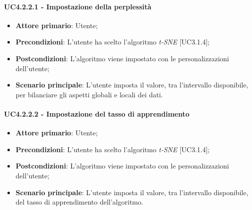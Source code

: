 \paragraph{UC4.2.2.1 - Impostazione della perplessità}
\begin{itemize}
	\item \textbf{Attore primario}: Utente;
	
	\item \textbf{Precondizioni}: L'utente ha scelto l'algoritmo \textit{t-SNE} [UC3.1.4];
	
	\item \textbf{Postcondizioni}: L'algoritmo viene impostato con le personalizzazioni dell'utente;
	
	\item \textbf{Scenario principale}: L'utente imposta il valore, tra l'intervallo disponibile, per bilanciare gli aspetti globali e locali dei dati.

\end{itemize}
	
\paragraph{UC4.2.2.2 - Impostazione del tasso di apprendimento}
\begin{itemize}
	\item \textbf{Attore primario}: Utente;
	
	\item \textbf{Precondizioni}: L'utente ha scelto l'algoritmo \textit{t-SNE} [UC3.1.4];
	
	\item \textbf{Postcondizioni}: L'algoritmo viene impostato con le personalizzazioni dell'utente;
	
	\item \textbf{Scenario principale}: L'utente imposta il valore, tra l'intervallo disponibile, del tasso di apprendimento dell'algoritmo.

\end{itemize}

\newpage

